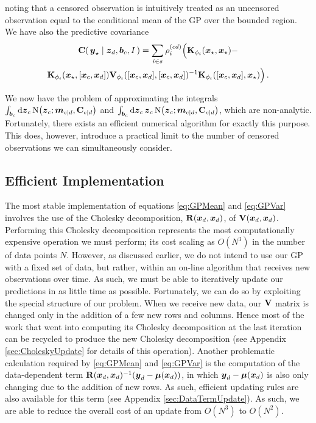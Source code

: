 \documentclass{acmtrans2m}
\begin{document}
noting that a censored observation is intuitively treated as an uncensored observation equal to the conditional mean of the GP over the bounded region. We have also the predictive covariance
\begin{multline} \label{eq:CensoredCov}
\mathbf{C}\!\left(\,\boldsymbol{y}_\star\mid\boldsymbol{z}_d,\boldsymbol{b}_c,I\,\right)=\sum_{i\in s}\rho^{(cd)}_i \Big(\mathbf{K}_{\phi_i}(\boldsymbol{x}_\star,\boldsymbol{x}_\star)-\\\mathbf{K}_{\phi_i}(\boldsymbol{x}_\star,[\boldsymbol{x}_c,\boldsymbol{x}_d])\mathbf{V}_{\phi_i}([\boldsymbol{x}_c,\boldsymbol{x}_d],[\boldsymbol{x}_c,\boldsymbol{x}_d])^{-1}\mathbf{K}_{\phi_i}([\boldsymbol{x}_c,\boldsymbol{x}_d],\boldsymbol{x}_\star)\Big)\,.
\end{multline}

We now have the problem of approximating the integrals $\int_{\boldsymbol{b}_c}\mathrm{d}\boldsymbol{z}_c\,\text{N}\!\left(\boldsymbol{z}_c;\boldsymbol{m}_{c|d},\mathbf{C}_{c|d}\right)$ and $\int_{\boldsymbol{b}_c}\mathrm{d}\boldsymbol{z}_c\,\boldsymbol{z}_c\, \text{N}\!\left(\boldsymbol{z}_c;\boldsymbol{m}_{c|d},\mathbf{C}_{c|d}\right)$, which are non-analytic. Fortunately, there exists an efficient numerical algorithm \cite{genz1992ncm} for exactly this purpose. This does, however, introduce a practical limit to the number of censored observations we can simultaneously consider.

\subsection{Efficient Implementation}\label{sec_efficient}

\noindent The most stable implementation of equations \eqref{eq:GPMean} and \eqref{eq:GPVar} involves the use of the Cholesky decomposition, $\mathbf{R}(\boldsymbol{x}_d,\boldsymbol{x}_d)$, of $\mathbf{V}(\boldsymbol{x}_d,\boldsymbol{x}_d)$. %
Performing this Cholesky decomposition represents the most computationally expensive operation we must perform; its cost scaling as $O(N^3)$ in the number of data points $N$. However, as discussed earlier, we do not intend to use our GP with a fixed set of data, but rather, within an on-line algorithm that receives new observations over time. As such, we must be able to iteratively update our predictions in as little time as possible. Fortunately, we can do so by exploiting the special structure of our problem. When we receive new data, our $\mathbf{V}$ matrix is changed only in the addition of a few new rows and columns. Hence most of the work that went into computing its Cholesky decomposition at the last iteration can be recycled to produce the new Cholesky decomposition (see Appendix \ref{sec:CholeskyUpdate} for details of this operation). Another problematic calculation required by \eqref{eq:GPMean} and \eqref{eq:GPVar} is the computation of the data-dependent term $\mathbf{R}(\boldsymbol{x}_d,\boldsymbol{x}_d)^{-1}(\boldsymbol{y}_d-\boldsymbol{\mu}(\boldsymbol{x}_d))$, in which $\boldsymbol{y}_d-\boldsymbol{\mu}(\boldsymbol{x}_d)$ is also only changing due to the addition of new rows. As such, efficient updating rules are also available for this term (see Appendix \ref{sec:DataTermUpdate}). As such, we are able to reduce the overall cost of an update from $O(N^3)$ to $O(N^2)$.
\end{document}
